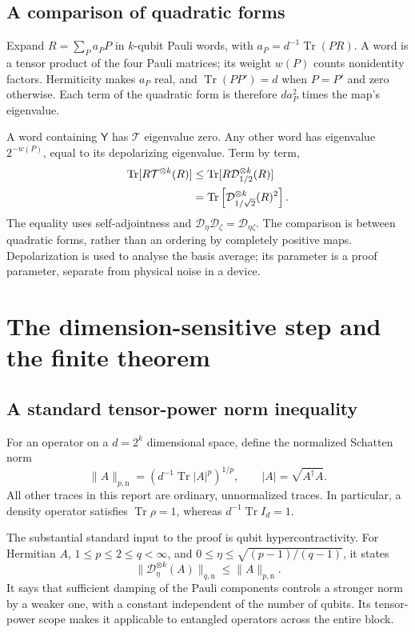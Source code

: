 \documentclass[11pt,a4paper]{article}
\newcommand{\Tr}{\operatorname{Tr}}
\newcommand{\Dmap}{\mathcal D}
\newcommand{\YY}{\mathsf Y}
\newcommand{\normn}[2]{\lVert #1\rVert_{#2,\mathrm n}}
\newcommand{\newsection}[1]{\section{#1}}
\begin{document}
\subsection{A comparison of quadratic forms}
Expand $R=\sum_P a_PP$ in $k$-qubit Pauli words, with $a_P=d^{-1}\Tr(PR)$. A word is a tensor product of the four Pauli matrices; its weight $w(P)$ counts nonidentity factors. Hermiticity makes $a_P$ real, and $\Tr(PP')=d$ when $P=P'$ and zero otherwise. Each term of the quadratic form is therefore $d a_P^2$ times the map's eigenvalue.

A word containing $\YY$ has $\mathcal T$ eigenvalue zero. Any other word has eigenvalue $2^{-w(P)}$, equal to its depolarizing eigenvalue. Term by term,
\begin{align}
\Tr[R\mathcal T^{\otimes k}(R)]
&\leq\Tr[R\Dmap_{1/2}^{\otimes k}(R)]\notag\\
&=\Tr\left[\Dmap_{1/\sqrt2}^{\otimes k}(R)^2\right].\label{eq:depolarize}
\end{align}
The equality uses self-adjointness and $\Dmap_\eta\Dmap_\zeta=\Dmap_{\eta\zeta}$. The comparison is between quadratic forms, rather than an ordering by completely positive maps. Depolarization is used to analyse the basis average; its parameter is a proof parameter, separate from physical noise in a device.

\newsection{The dimension-sensitive step and the finite theorem}
\subsection{A standard tensor-power norm inequality}
For an operator on a $d=2^k$ dimensional space, define the normalized Schatten norm
\[
\normn{A}{p}=\left(d^{-1}\Tr|A|^p\right)^{1/p},
\qquad |A|=\sqrt{A^\dagger A}.
\]
All other traces in this report are ordinary, unnormalized traces. In particular, a density operator satisfies $\Tr\rho=1$, whereas $d^{-1}\Tr I_d=1$.

The substantial standard input to the proof is qubit hypercontractivity. For Hermitian $A$, $1\leq p\leq2\leq q<\infty$, and
$0\leq\eta\leq\sqrt{(p-1)/(q-1)}$, it states
\begin{equation}\label{eq:hc}
\normn{\Dmap_\eta^{\otimes k}(A)}{q}\leq\normn{A}{p}.
\end{equation}
It says that sufficient damping of the Pauli components controls a stronger norm by a weaker one, with a constant independent of the number of qubits. Its tensor-power scope makes it applicable to entangled operators across the entire block.
\end{document}
